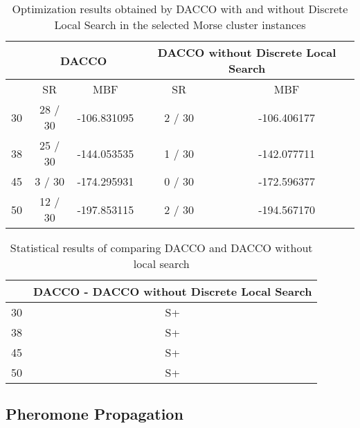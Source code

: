 		\begin{table}[!htdp]
				\begin{center}
					\begin{tabular}{| c | c | c | c | c |}
						\hline
						~ & \multicolumn{2}{c|}{\textbf{DACCO}} & \multicolumn{2}{p{4cm}|}{\textbf{DACCO without Discrete Local Search}} \\ \hline
						~ & SR & MBF & SR & MBF \\ \hline
						30 & 28 / 30 & -106.831095 & 2 / 30 & -106.406177 \\ \hline
						38 & 25 / 30 & -144.053535 & 1 / 30 & -142.077711 \\ \hline
						45 & 3 / 30 & -174.295931 & 0 / 30 & -172.596377 \\ \hline
						50 & 12 / 30 & -197.853115 & 2 / 30 & -194.567170 \\ \hline
					\end{tabular}
					\caption{Optimization results obtained by DACCO with and without Discrete Local Search in the selected Morse cluster instances}
					\label{tab:discrete_local_search_results}
				\end{center}
		\end{table}
		
		\begin{table}[!htdp]
				\begin{center}
					\begin{tabular}{| c | c |}
						\hline
						~ & \multicolumn{1}{p{4cm}|}{\textbf{DACCO - DACCO without Discrete Local Search}} \\ \hline
						30 & S+ \\ \hline
						38 & S+ \\ \hline
						45 & S+ \\ \hline
						50 & S+ \\ \hline
					\end{tabular}
					\caption{Statistical results of comparing DACCO and DACCO without local search}
					\label{tab:statistical_comparison_discrete_local_search}
				\end{center}
		\end{table}
		
		
		\pagebreak
		
		\subsection{Pheromone Propagation}
		
